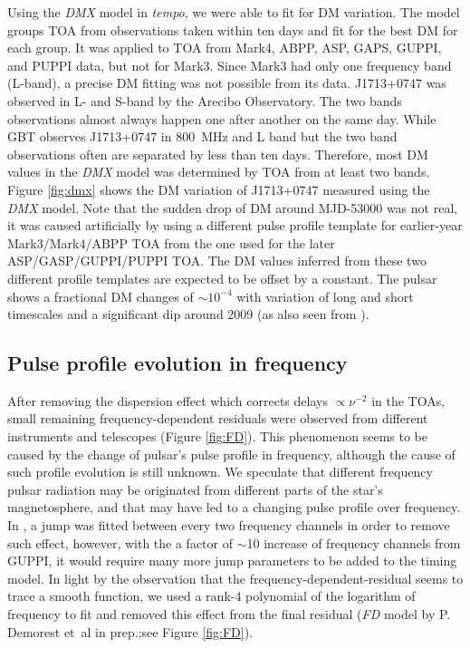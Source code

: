 Using the {\it DMX} model in {\it tempo}, we were able to fit for DM
variation. 
The model groups TOA from observations taken within ten days and fit for the
best DM for each group.   
It was applied to TOA from Mark4, ABPP, ASP, GAPS, GUPPI, and PUPPI data, but
not for Mark3. Since Mark3 had only one frequency band (L-band), a precise DM
fitting was not possible from its data.
J1713+0747 was observed in L- and S-band by the Arecibo Observatory. The
two bands observations almost always happen one after another on the same day.
While GBT observes J1713+0747 in 800~MHz and L band but the two band
observations often are separated by less than ten days.
Therefore, most DM values in the {\it DMX} model was determined by TOA from at
least two bands. Figure \ref{fig:dmx} shows the DM variation of J1713+0747 
measured using the {\it DMX} model.
Note that the sudden drop of DM around MJD-53000 was not real, it was caused
artificially by using a different pulse profile template for earlier-year Mark3/Mark4/ABPP TOA 
from the one used for the later
ASP/GASP/GUPPI/PUPPI TOA. The DM values inferred from these two different profile
templates are expected to be offset by a constant.
The pulsar shows a fractional DM changes of $\sim10^{-4}$ with variation of
long and short timescales and a significant dip around 2009 (as also seen from
\citealt{dfg+13}).



\subsection{Pulse profile evolution in frequency}
\label{sec:FD}
After removing the dispersion effect which corrects delays $\propto \nu^{-2}$
in the TOAs, small remaining frequency-dependent residuals were observed from
different instruments and telescopes (Figure \ref{fig:FD}).  
This phenomenon seems to be caused by the change of pulsar's pulse profile in
frequency, although the cause of such profile evolution is still unknown.
We speculate that different frequency pulsar radiation may be originated from
different parts of the star's magnetosphere, and that may have led to a
changing pulse profile over frequency.
In \citet{sns+05}, a jump was fitted between every two frequency channels in
order to remove such effect, however, with the a factor of $\sim$10 increase
of frequency channels from GUPPI, it would require many more jump parameters
to be added to the timing model.
In light by the observation that the frequency-dependent-residual seems to
trace a smooth function, we used a rank-4 polynomial of the logarithm of
frequency to fit and removed this effect from the final residual ({\it FD}
model by P. Demorest et~al in prep.;see Figure \ref{fig:FD}). 



